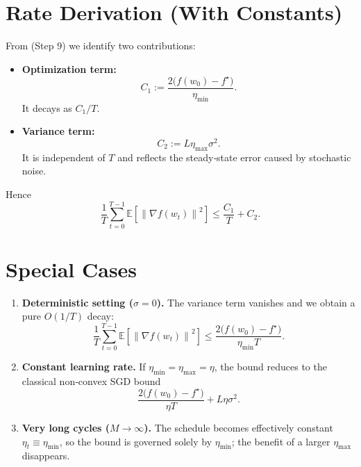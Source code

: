 \documentclass{article}
\newcommand{\EE}{\mathbb{E}}
\newcommand{\norm}[1]{\left\|#1\right\|}
\begin{document}
\section*{Rate Derivation (With Constants)}
From (Step 9) we identify two contributions:

\begin{itemize}
\item \textbf{Optimization term:}
\[
C_1:=\frac{2\bigl(f(w_0)-f^{\star}\bigr)}{\eta_{\min}} .
\]
It decays as $C_1/T$.
\item \textbf{Variance term:}
\[
C_2:=L\eta_{\max}\sigma^2 .
\]
It is independent of $T$ and reflects the steady‑state error caused by stochastic noise.
\end{itemize}
Hence
\[
\frac{1}{T}\sum_{t=0}^{T-1}\EE\!\left[\norm{\nabla f(w_t)}^2\right]
\le \frac{C_1}{T}+C_2 .
\]

\section*{Special Cases}
\begin{enumerate}
\item \textbf{Deterministic setting ($\sigma=0$).}
The variance term vanishes and we obtain a pure $O(1/T)$ decay:
\[
\frac{1}{T}\sum_{t=0}^{T-1}\EE\!\left[\norm{\nabla f(w_t)}^2\right]
\le \frac{2\bigl(f(w_0)-f^{\star}\bigr)}{\eta_{\min}T}.
\]
\item \textbf{Constant learning rate.}
If $\eta_{\min}=\eta_{\max}=\eta$, the bound reduces to the classical
non‑convex SGD bound
\[
\frac{2\bigl(f(w_0)-f^{\star}\bigr)}{\eta T}+L\eta\sigma^2 .
\]
\item \textbf{Very long cycles ($M\to\infty$).}
The schedule becomes effectively constant $\eta_t\equiv\eta_{\min}$,
so the bound is governed solely by $\eta_{\min}$; the benefit of a larger
$\eta_{\max}$ disappears.
\end{enumerate}
\end{document}
